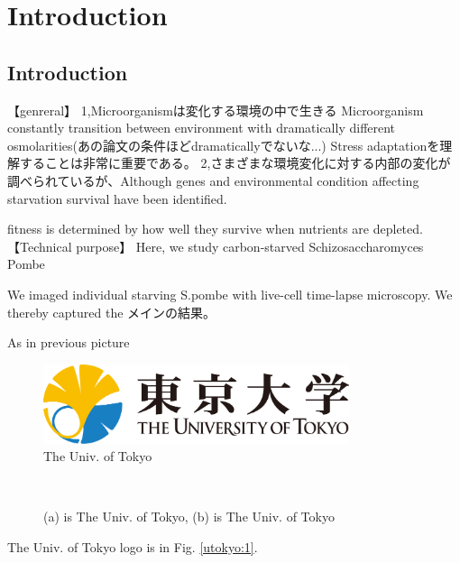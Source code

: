 \chapter{Introduction}
\section{Introduction}
【genreral】
1,Microorganismは変化する環境の中で生きる
Microorganism constantly transition between environment with dramatically different osmolarities(あの論文の条件ほどdramaticallyでないな...)
Stress adaptationを理解することは非常に重要である。
2,さまざまな環境変化に対する内部の変化が調べられているが、Although genes and environmental condition affecting starvation survival have been identified.

fitness is determined by how well they survive when nutrients are depleted.
【Technical purpose】
Here, we study carbon-starved {Schizosaccharomyces Pombe}

We imaged individual starving {S.pombe} with live-cell time-lapse microscopy.
We thereby captured the メインの結果。

As in previous picture
\begin{figure}[htbp]
\centerline{\includegraphics[width=0.8\textwidth]{figure/UTokyo_logo.png}}
\caption{The Univ. of Tokyo\cite{nonlinear}} 
\end{figure}

\begin{figure}[H]
  \centering
  \newcommand{\subfig}[2]{%
    \subfloat[]{\texttt{[image: \#1]}\label{#2}}%
  }
  \subfig{figure/UTokyo_logo.png}{utokyo:1} \\
  \subfig{figure/UTokyo_logo.png}{utokyo:2}

  \captionsetup{font=small}
  \caption{(a) is The Univ. of Tokyo, (b) is The Univ. of Tokyo}
  \label{utokyo}
\end{figure}

The Univ. of Tokyo logo is in Fig. \ref{utokyo:1}.

\begin{figure}[H]
  \centering
  \newcommand{\subfig}[2]{%
    \subfloat[]{\texttt{[image: \#1]}\label{#2}}%
  }
  \subfig{figure/UTokyo_logo.png}{utokyo:3} 
\end{figure}

